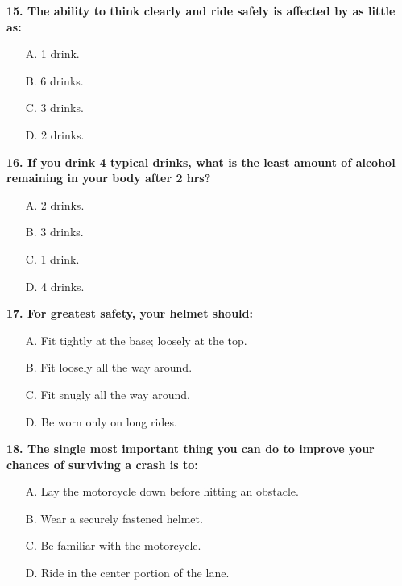 \begin{minipage}{\linewidth}
\vspace{1em}\noindent\textbf{15. The ability to think clearly and ride safely is affected by as little as:}

\begin{itemize}[nosep,leftmargin=2em]
\item [A.] 1 drink.
\item [B.] 6 drinks.
\item [C.] 3 drinks.
\item [D.] 2 drinks.

\end{itemize}
\end{minipage}


\begin{minipage}{\linewidth}
\vspace{1em}\noindent\textbf{16. If you drink 4 typical drinks, what is the least amount of alcohol remaining in your body after 2 hrs?}

\begin{itemize}[nosep,leftmargin=2em]
\item [A.] 2 drinks.
\item [B.] 3 drinks.
\item [C.] 1 drink.
\item [D.] 4 drinks.

\end{itemize}
\end{minipage}


\begin{minipage}{\linewidth}
\vspace{1em}\noindent\textbf{17. For greatest safety, your helmet should:}

\begin{itemize}[nosep,leftmargin=2em]
\item [A.] Fit tightly at the base; loosely at the top.
\item [B.] Fit loosely all the way around.
\item [C.] Fit snugly all the way around.
\item [D.] Be worn only on long rides.

\end{itemize}
\end{minipage}


\begin{minipage}{\linewidth}
\vspace{1em}\noindent\textbf{18. The single most important thing you can do to improve your chances of surviving a crash is to:}

\begin{itemize}[nosep,leftmargin=2em]
\item [A.] Lay the motorcycle down before hitting an obstacle.
\item [B.] Wear a securely fastened helmet.
\item [C.] Be familiar with the motorcycle.
\item [D.] Ride in the center portion of the lane.

\end{itemize}
\end{minipage}


